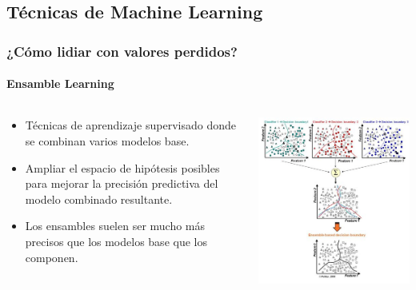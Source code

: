 \documentclass{beamer}
\begin{document}
\subsection{Técnicas de Machine Learning}
\begin{frame}
	\frametitle{¿Cómo lidiar con valores perdidos?}
	\framesubtitle{Ensamble Learning}
	\begin{columns}
		\begin{column}{0.48\textwidth}
			\begin{itemize}		
					\item Técnicas de aprendizaje supervisado donde se combinan varios modelos base.
					\item Ampliar el espacio de hipótesis posibles para mejorar la precisión predictiva del modelo combinado resultante.
					\item Los ensambles suelen ser mucho más precisos que los modelos base que los componen.
			\end{itemize}
		\end{column}
		\begin{column}{0.85\textwidth}
			\includegraphics[width=0.657\linewidth, height=0.7\textheight]{../img/ensamble.jpg}
		\end{column}
	\end{columns}
\end{frame}
\end{document}

